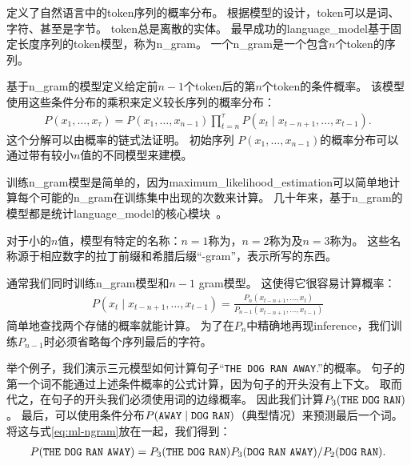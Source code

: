 定义了自然语言中的\gls{token}序列的概率分布。
根据模型的设计，\gls{token}可以是词、字符、甚至是字节。
\gls{token}总是离散的实体。
最早成功的\gls{language_model}基于固定长度序列的\gls{token}模型，称为\gls{n_gram}。
一个\gls{n_gram}是一个包含$n$个\gls{token}的序列。


基于\gls{n_gram}的模型定义给定前$n-1$个\gls{token}后的第$n$个\gls{token}的条件概率。
该模型使用这些条件分布的乘积来定义较长序列的概率分布：
\begin{align}
P(x_1, \dots, x_\tau) = P(x_1, \dots, x_{n-1}) \prod_{t=n}^\tau P(x_t \mid x_{t-n+1}, \dots, x_{t-1} ).
\end{align}
这个分解可以由概率的链式法证明。
初始序列 $P(x_1, \dots, x_{n-1})$的概率分布可以通过带有较小$n$值的不同模型来建模。

训练\gls{n_gram}模型是简单的，因为\gls{maximum_likelihood_estimation}可以简单地计算每个可能的\gls{n_gram}在训练集中出现的次数来计算。                                                                                                                                                                                                                                                                                                                                                                                       
几十年来，基于\gls{n_gram}的模型都是统计\gls{language_model}的核心模块~\citep{Jelinek+Mercer80,Katz87,Chen+Goodman99}。

对于小的$n$值，模型有特定的名称：$n=1$称为，$n=2$称为及$n=3$称为。
这些名称源于相应数字的拉丁前缀和希腊后缀``-gram''，表示所写的东西。


通常我们同时训练\gls{n_gram}模型和$n-1$ gram模型。 
这使得它很容易计算概率：
\begin{align}
\label{eq:ml-ngram}
P(x_t \mid x_{t-n+1}, \dots, x_{t-1}) = \frac{P_n(x_{t-n+1}, \dots, x_t)} { P_{n-1}( x_{t-n+1}, \dots, x_{t-1}) }
\end{align}
简单地查找两个存储的概率就能计算。
为了在$P_n$中精确地再现\gls{inference}，我们训练$P_{n-1}$时必须省略每个序列最后的字符。

举个例子，我们演示三元模型如何计算句子``{\tt THE DOG RAN AWAY}.''的概率。
句子的第一个词不能通过上述条件概率的公式计算，因为句子的开头没有上下文。
取而代之，在句子的开头我们必须使用词的边缘概率。
因此我们计算$P_3({\tt THE\ DOG\ RAN})$。
最后，可以使用条件分布$P({\tt AWAY} \mid {\tt DOG\ RAN})$（典型情况）来预测最后一个词。
将这与式\eqref{eq:ml-ngram}放在一起，我们得到：
\begin{align}
P({\tt THE\ DOG\ RAN\ AWAY}) = P_3({\tt THE\ DOG\ RAN}) P_3({\tt DOG\ RAN\ AWAY}) / P_2({\tt DOG\ RAN}).
\end{align}

